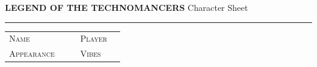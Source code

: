 \newcommand{\sheetskillblank}{%
  \rule{30mm}{0.3pt} &
  \raisebox{1pt}{\framebox[5mm]{\phantom{B}}} &
  \sheetknownbox\\[1.5pt]}

\newcommand{\sheetitemrow}{\rule{42mm}{0.3pt}\hspace{3pt}\sheetfourpips\par\vspace{4pt}}

\newcommand{\sheetsechead}[2][atrAccent]{%
  \par{\color{#1}\rule{\linewidth}{0.7pt}}\par\vspace{1pt}%
  {\hdfont\bfseries\footnotesize\color{#1}#2}\par\vspace{4pt}}

\newcommand{\sheettattoobox}[1][55mm]{%
  \par
  \begin{tikzpicture}
    \draw[color=atrAccent, line width=0.9pt, rounded corners=2pt]
      (0,0) rectangle (\linewidth, #1);
    \draw[color=atrAccent, line width=0.3pt, opacity=0.5, rounded corners=1pt]
      (2mm, 2mm) rectangle (\linewidth-2mm, #1-2mm);
    \node[anchor=south, opacity=0.18, font=\hdfont\footnotesize\color{atrAccent}]
      at (0.5\linewidth, 2.5mm) {TATTOOS};
  \end{tikzpicture}
  \par}

{}

\noindent
{\hdfont\bfseries\normalsize\color{atrAccent}LEGEND OF THE TECHNOMANCERS}
\hfill
{\hdfont\small\color{atrRule}Character Sheet}%
\hspace{4pt}
\par\vspace{2pt}
{\color{atrAccent}\rule{\linewidth}{1.2pt}}
\par\vspace{5pt}

\begin{tabularx}{\linewidth}{@{}lXp{4mm}lX@{}}
  {\small\textsc{Name}} &
  \underline{\hfill} & &
  {\small\textsc{Player}} &
  \underline{\hfill} \\[6pt]
  {\small\textsc{Appearance}} &
  \underline{\hfill} & &
  {\small\textsc{Vibes}} &
  \underline{\hfill} \\
\end{tabularx}


